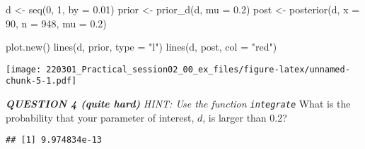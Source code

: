 \documentclass[
]{article}
\newenvironment{Shaded}{\begin{snugshade}}{\end{snugshade}}
\newcommand{\AttributeTok}[1]{\textcolor[rgb]{0.77,0.63,0.00}{#1}}
\newcommand{\DecValTok}[1]{\textcolor[rgb]{0.00,0.00,0.81}{#1}}
\newcommand{\FloatTok}[1]{\textcolor[rgb]{0.00,0.00,0.81}{#1}}
\newcommand{\FunctionTok}[1]{\textcolor[rgb]{0.00,0.00,0.00}{#1}}
\newcommand{\NormalTok}[1]{#1}
\newcommand{\OtherTok}[1]{\textcolor[rgb]{0.56,0.35,0.01}{#1}}
\newcommand{\SpecialCharTok}[1]{\textcolor[rgb]{0.00,0.00,0.00}{#1}}
\newcommand{\StringTok}[1]{\textcolor[rgb]{0.31,0.60,0.02}{#1}}
\begin{document}
\begin{Shaded}
\begin{Highlighting}[]
\NormalTok{d }\OtherTok{\textless{}{-}} \FunctionTok{seq}\NormalTok{(}\DecValTok{0}\NormalTok{, }\DecValTok{1}\NormalTok{, }\AttributeTok{by =} \FloatTok{0.01}\NormalTok{)}
\NormalTok{prior }\OtherTok{\textless{}{-}} \FunctionTok{prior\_d}\NormalTok{(d, }\AttributeTok{mu =} \FloatTok{0.2}\NormalTok{)}
\NormalTok{post }\OtherTok{\textless{}{-}} \FunctionTok{posterior}\NormalTok{(d, }\AttributeTok{x =} \DecValTok{90}\NormalTok{, }\AttributeTok{n =} \DecValTok{948}\NormalTok{, }\AttributeTok{mu =} \FloatTok{0.2}\NormalTok{)}

\FunctionTok{plot.new}\NormalTok{()}
\FunctionTok{lines}\NormalTok{(d, prior, }\AttributeTok{type =} \StringTok{"l"}\NormalTok{)}
\FunctionTok{lines}\NormalTok{(d, post, }\AttributeTok{col =} \StringTok{"red"}\NormalTok{)}
\end{Highlighting}
\end{Shaded}

\texttt{[image: 220301\_Practical\_session02\_00\_ex\_files/figure-latex/unnamed-chunk-5-1.pdf]}

\emph{\textbf{QUESTION 4 (quite hard)}} \emph{HINT: Use the function
\texttt{integrate}} What is the probability that your parameter of
interest, \(d\), is larger than 0.2?

\begin{Shaded}
\end{Shaded}

\begin{verbatim}
## [1] 9.974834e-13
\end{verbatim}
\end{document}
